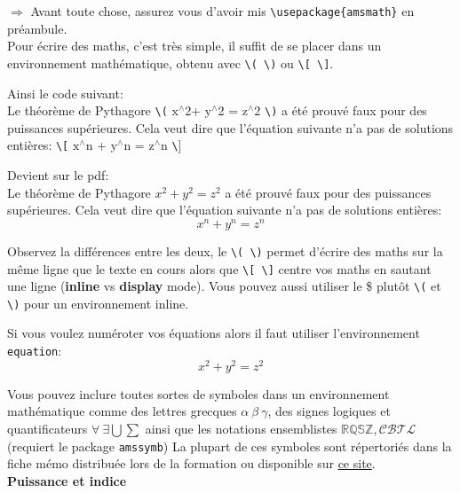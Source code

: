\documentclass[11pt]{article}				%
\newcommand{\tb}{\textbackslash}
\newcommand{\cmd}[2]{\texttt{\textbackslash #1}\texttt{\{#2\}}}
\begin{document}
$\Rightarrow$ Avant toute chose, assurez vous d'avoir mis \cmd{usepackage}{amsmath} en préambule.\\

Pour écrire des maths, c'est très simple, il suffit de se placer dans un environnement mathématique, obtenu avec \texttt{\tb( \tb)} ou \texttt{\tb[ \tb]}. 

\begin{multicols}{2}
Ainsi le code suivant:\\
\textsf{Le théorème de Pythagore \texttt{\tb(} $\text{x}^{\wedge}$2+ $\text{y}^{\wedge}$2 = $\text{z}^{\wedge}$2 \texttt{\tb)} a été prouvé faux pour des puissances supérieures. Cela veut dire que l'équation suivante n'a pas de solutions entières:
	 \texttt{\tb[} $\text{x}^{\wedge}$n + $\text{y}^{\wedge}$n = $\text{z}^{\wedge}$n \texttt{\tb}] }
	
	\columnbreak
	
	Devient sur le pdf:\\	
	Le théorème de Pythagore $x^2 + y^2 = z^2$ a été prouvé faux pour des puissances supérieures. Cela veut dire que l'équation suivante n'a pas de solutions entières: \[ x^n + y^n = z^n \]
	
	
	
\end{multicols}

Observez la différences entre les deux, le \texttt{\tb( \tb)} permet d'écrire des maths sur la même ligne que le texte en cours alors que \texttt{\tb[ \tb]} centre vos maths en sautant une ligne (\textbf{inline} vs \textbf{display} mode). Vous pouvez aussi utiliser le \$ plutôt \texttt{\tb(} et \texttt{\tb)} pour un environnement inline.

Si vous voulez numéroter vos équations alors il faut utiliser l'environnement \texttt{equation}:
\begin{equation}
x^2 +y^2 = z^2
\end{equation}

Vous pouvez inclure toutes sortes de symboles dans un environnement mathématique comme des lettres grecques $\alpha \ \beta \ \gamma$, des signes logiques et quantificateurs $\forall \ \exists \bigcup \sum$ ainsi que les notations ensemblistes $\mathbb{RQSZ}, \mathcal{CBTL}$ (requiert le package \verb|amssymb|) La plupart de ces symboles sont répertoriés dans la fiche mémo distribuée lors de la formation ou disponible sur \href{http://latex.enpc.org}{ce site}.\\

\textbf{Puissance et indice}\\
\end{document}
